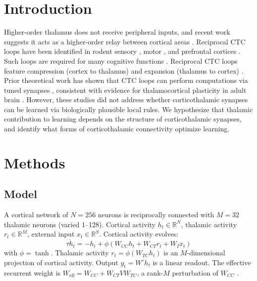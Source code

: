 \documentclass[11pt]{article}
\begin{document}
\section{Introduction}
Higher-order thalamus does not receive peripheral inputs, and recent work suggests it acts as a higher-order relay between cortical areas \cite{sherman2007thalamus,sherman2018thalamus}. Reciprocal CTC loops have been identified in rodent sensory \cite{guo2020anterior}, motor \cite{yamawaki2015corticothalamic,guo2018maintenance,economo2018distinct,munoz2021cellular}, and prefrontal cortices \cite{collins2018reciprocal}. Such loops are required for many cognitive functions \cite{bolkan2017thalamic,guo2017maintenance,schmitt2017thalamic,rikhye2018thalamic,alcaraz2018flexible}. Reciprocal CTC loops feature compression (cortex to thalamus) and expansion (thalamus to cortex) \cite{zhaoping2006theoretical,druckmann2012framework,olshausen1996emergence,zhu2013visual,zhang2016readout,qin2019nonlinear,litwin2017optimal,muscinelli2022optimal,xie2022taskdependent}. Prior theoretical work has shown that CTC loops can perform computations via tuned synapses \cite{kao2021optimal,logiaco2021thalamic}, consistent with evidence for thalamocortical plasticity in adult brain \cite{herry1999plasticity,oberlaender2012functional,biane2016motor,audette2019plasticity,hasegawa2020selective,adam2021context,sohn2022tonic}. However, these studies did not address whether corticothalamic synapses can be learned via biologically plausible local rules. We hypothesize that thalamic contribution to learning depends on the structure of corticothalamic synapses, and identify what forms of corticothalamic connectivity optimize learning.

\section{Methods}
\subsection{Model}
A cortical network of $N = 256$ neurons is reciprocally connected with $M = 32$ thalamic neurons (varied 1--128). Cortical activity $h_t \in \mathbb{R}^N$, thalamic activity $r_t \in \mathbb{R}^M$, external input $x_t \in \mathbb{R}^S$. Cortical activity evolves:
\begin{equation}
\tau \dot{h}_t = -h_t + \phi(W_{CC} h_t + W_{CT} r_t + W_I x_t)
\end{equation}
with $\phi = \tanh$. Thalamic activity $r_t = \phi(W_{TC} h_t)$ is an $M$-dimensional projection of cortical activity. Output $y_t = W^\circ h_t$ is a linear readout. The effective recurrent weight is $W_{\mathrm{eff}} = W_{CC} + W_{CT} V W_{TC}$, a rank-$M$ perturbation of $W_{CC}$ \cite{mastrogiuseppe2018linking,schuessler2020dynamics,dubreuil2022role}.
\end{document}
